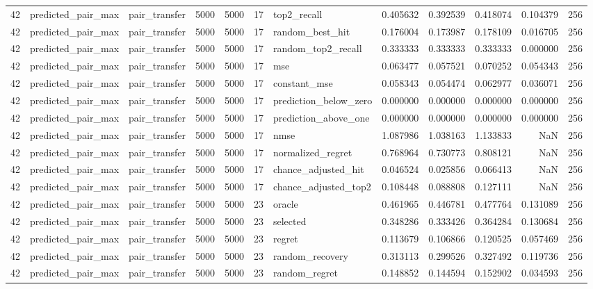 \begin{tabular}{rllrrrlrrrrr}
42 & predicted_pair_max & pair_transfer & 5000 & 5000 & 17 & top2_recall & 0.405632 & 0.392539 & 0.418074 & 0.104379 & 256 \\
42 & predicted_pair_max & pair_transfer & 5000 & 5000 & 17 & random_best_hit & 0.176004 & 0.173987 & 0.178109 & 0.016705 & 256 \\
42 & predicted_pair_max & pair_transfer & 5000 & 5000 & 17 & random_top2_recall & 0.333333 & 0.333333 & 0.333333 & 0.000000 & 256 \\
42 & predicted_pair_max & pair_transfer & 5000 & 5000 & 17 & mse & 0.063477 & 0.057521 & 0.070252 & 0.054343 & 256 \\
42 & predicted_pair_max & pair_transfer & 5000 & 5000 & 17 & constant_mse & 0.058343 & 0.054474 & 0.062977 & 0.036071 & 256 \\
42 & predicted_pair_max & pair_transfer & 5000 & 5000 & 17 & prediction_below_zero & 0.000000 & 0.000000 & 0.000000 & 0.000000 & 256 \\
42 & predicted_pair_max & pair_transfer & 5000 & 5000 & 17 & prediction_above_one & 0.000000 & 0.000000 & 0.000000 & 0.000000 & 256 \\
42 & predicted_pair_max & pair_transfer & 5000 & 5000 & 17 & nmse & 1.087986 & 1.038163 & 1.133833 & NaN & 256 \\
42 & predicted_pair_max & pair_transfer & 5000 & 5000 & 17 & normalized_regret & 0.768964 & 0.730773 & 0.808121 & NaN & 256 \\
42 & predicted_pair_max & pair_transfer & 5000 & 5000 & 17 & chance_adjusted_hit & 0.046524 & 0.025856 & 0.066413 & NaN & 256 \\
42 & predicted_pair_max & pair_transfer & 5000 & 5000 & 17 & chance_adjusted_top2 & 0.108448 & 0.088808 & 0.127111 & NaN & 256 \\
42 & predicted_pair_max & pair_transfer & 5000 & 5000 & 23 & oracle & 0.461965 & 0.446781 & 0.477764 & 0.131089 & 256 \\
42 & predicted_pair_max & pair_transfer & 5000 & 5000 & 23 & selected & 0.348286 & 0.333426 & 0.364284 & 0.130684 & 256 \\
42 & predicted_pair_max & pair_transfer & 5000 & 5000 & 23 & regret & 0.113679 & 0.106866 & 0.120525 & 0.057469 & 256 \\
42 & predicted_pair_max & pair_transfer & 5000 & 5000 & 23 & random_recovery & 0.313113 & 0.299526 & 0.327492 & 0.119736 & 256 \\
42 & predicted_pair_max & pair_transfer & 5000 & 5000 & 23 & random_regret & 0.148852 & 0.144594 & 0.152902 & 0.034593 & 256 \\

\end{tabular}
